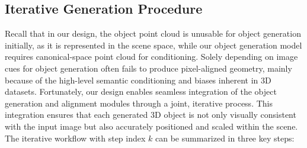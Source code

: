 



\subsection{Iterative Generation Procedure}

Recall that in our design, the object point cloud is unusable for object generation initially, as it is represented in the scene space, while our object generation model requires canonical-space point cloud for conditioning.
%
Solely depending on image cues for object generation often fails to produce pixel-aligned geometry, mainly because of the high-level semantic conditioning and biases inherent in 3D datasets.
Fortunately, our design enables seamless integration of the object generation and alignment modules through a joint, iterative process. 
This integration ensures that each generated 3D object is not only visually consistent with the input image but also accurately positioned and scaled within the scene. The iterative workflow with step index $k$ can be summarized in three key steps:


